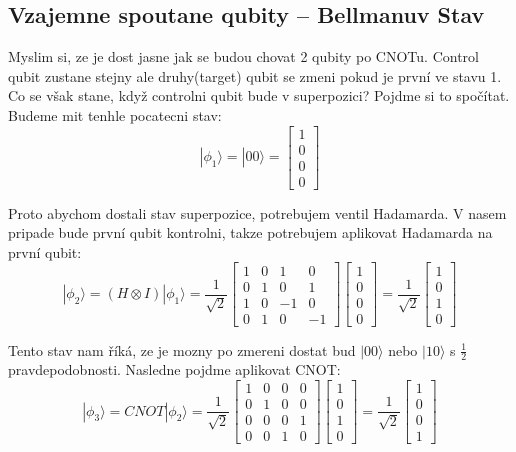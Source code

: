 \documentclass[12pt]{article}
\begin{document}
\subsection{Vzajemne spoutane qubity – Bellmanuv Stav}
Myslim si, ze je dost jasne jak se budou chovat 2 qubity po CNOTu.
Control qubit zustane stejny ale druhy(target) qubit se zmeni pokud je první ve stavu 1.
Co se však stane, když controlni qubit bude v superpozici? Pojdme si to spočítat.
Budeme mit tenhle pocatecni stav:
$$|\phi_1 \rangle = |00\rangle = \begin{bmatrix}
        1 \\
        0 \\
        0 \\
        0
    \end{bmatrix}$$
\par Proto abychom dostali stav superpozice, potrebujem ventil Hadamarda.
V nasem pripade bude první qubit kontrolni, takze potrebujem aplikovat Hadamarda na první qubit:
$$|\phi_2 \rangle = (H \otimes I) |\phi_1 \rangle = \frac{1}{\sqrt{2}} \begin{bmatrix}
        1 & 0 & 1  & 0  \\
        0 & 1 & 0  & 1  \\
        1 & 0 & -1 & 0  \\
        0 & 1 & 0  & -1
    \end{bmatrix}\begin{bmatrix}
        1 \\
        0 \\
        0 \\
        0
    \end{bmatrix} = \frac{1}{\sqrt{2}}\begin{bmatrix}
        1 \\
        0 \\
        1 \\
        0
    \end{bmatrix}$$
\par Tento stav nam říká, ze je mozny po zmereni dostat bud $|00\rangle$ nebo $|10\rangle$ s $\frac{1}{2}$ pravdepodobnosti.
Nasledne pojdme aplikovat CNOT:
$$|\phi_3 \rangle = CNOT |\phi_2 \rangle = \frac{1}{\sqrt{2}} \begin{bmatrix}
        1 & 0 & 0 & 0 \\
        0 & 1 & 0 & 0 \\
        0 & 0 & 0 & 1 \\
        0 & 0 & 1 & 0
    \end{bmatrix}\begin{bmatrix}
        1 \\
        0 \\
        1 \\
        0
    \end{bmatrix} = \frac{1}{\sqrt{2}}\begin{bmatrix}
        1 \\
        0 \\
        0 \\
        1
    \end{bmatrix}$$
\end{document}
